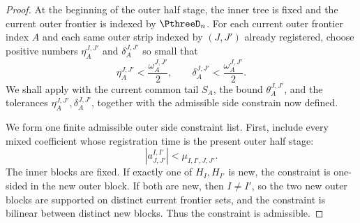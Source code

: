 \documentclass[11pt,reqno]{amsart}
\makeatletter
\theoremstyle{plain}
\theoremstyle{definition}
\newcounter{problempaper}
\newenvironment{problempaperbody}{%
  \setcounter{subsection}{0}%
  \setcounter{subsubsection}{0}%
  \setcounter{paragraph}{0}%
  \renewcommand{\thesubsection}{\arabic{subsection}}%
  \renewcommand{\thesubsubsection}{\thesubsection.\arabic{subsubsection}}%
  \renewcommand{\theparagraph}{\thesubsubsection.\arabic{paragraph}}%
  \let\problem@outersection\section
  \let\problem@outersubsection\subsection
  \let\problem@outersubsubsection\subsubsection
  \let\problem@outerparagraph\paragraph
  \let\section\problem@papersection
  \let\subsection\problem@papersubsection
  \let\subsubsection\problem@papersubsubsection
}{%
  \let\section\problem@outersection
  \let\subsection\problem@outersubsection
  \let\subsubsection\problem@outersubsubsection
  \let\paragraph\problem@outerparagraph
}
\newcommand{\problem@target}[2]{%
  \hypertarget{problem-\theproblempaper-#1-#2}{}%
}
\newcommand{\problem@paperheading}[3]{%
  \par\bigskip
  \problem@target{#1}{#2}%
  \noindent{\large\bfseries #2.\quad #3\par}%
  \nobreak\smallskip
}
\newcommand{\problem@papersubheading}[3]{%
  \par\medskip
  \problem@target{#1}{#2}%
  \noindent{\normalsize\bfseries #2.\quad #3\par}%
  \nobreak\smallskip
}
\newcommand{\problem@papersubsubheading}[3]{%
  \par\smallskip
  \problem@target{#1}{#2}%
  \noindent{\normalsize\itshape #2.\quad #3.\ }%
}
\def\problem@papersection{%
  \@ifstar{\problem@papersectionstar}{\problem@papersectionnostar}%
}
\def\problem@papersectionstar#1{%
  \par\bigskip\noindent{\large\bfseries #1\par}\nobreak\smallskip
}
\def\problem@papersectionnostar#1{%
  \refstepcounter{subsection}%
  \setcounter{subsubsection}{0}%
  \setcounter{paragraph}{0}%
  \problem@paperheading{section}{\thesubsection}{#1}%
  \problem@writecontentsline{section}{\thesubsection}{#1}%
}
\def\problem@papersubsection{%
  \@ifstar{\problem@papersubsectionstar}{\problem@papersubsectionnostar}%
}
\def\problem@papersubsectionstar#1{%
  \par\medskip\noindent{\normalsize\bfseries #1\par}\nobreak\smallskip
}
\def\problem@papersubsectionnostar#1{%
  \refstepcounter{subsubsection}%
  \setcounter{paragraph}{0}%
  \problem@papersubheading{subsection}{\thesubsubsection}{#1}%
  \problem@writecontentsline{subsection}{\thesubsubsection}{#1}%
}
\def\problem@papersubsubsection{%
  \@ifstar{\problem@papersubsubsectionstar}{\problem@papersubsubsectionnostar}%
}
\def\problem@papersubsubsectionstar#1{%
  \par\smallskip\noindent{\normalsize\itshape #1.\ }%
}
\def\problem@papersubsubsectionnostar#1{%
  \refstepcounter{paragraph}%
  \problem@papersubsubheading{subsubsection}{\theparagraph}{#1}%
  \problem@writecontentsline{subsubsection}{\theparagraph}{#1}%
}
\newcommand{\problem@writecontentsline}[3]{%
  \begingroup
  \protected@write\@auxout{}{%
    \string\problemcontentsentry{\theproblempaper}{#1}{#2}{#3}{\thepage}%
  }%
  \endgroup
}
\newcommand{\problemcontentsentry}[5]{%
  \@ifundefined{problemcontents@#1}{%
    \expandafter\gdef\csname problemcontents@#1\endcsname{}%
  }{}%
  \expandafter\g@addto@macro\csname problemcontents@#1\endcsname{%
    \problemcontentsline{#1}{#2}{#3}{#4}{#5}%
  }%
}
\newcommand{\problemcontentslink}[4]{%
  \hyperlink{problem-#1-#2-#3}{#4}%
}
\newcommand{\problemcontentsline}[5]{%
  \ifstrequal{#2}{section}{%
    \par\noindent
    \problemcontentslink{#1}{#2}{#3}{\makebox[2.5em][l]{#3}#4}%
    \nobreak\dotfill
    \problemcontentslink{#1}{#2}{#3}{#5}\par
  }{%
    \ifstrequal{#2}{subsection}{%
      \par\noindent\hspace*{1.5em}%
      \problemcontentslink{#1}{#2}{#3}{\makebox[3.5em][l]{#3}#4}%
      \nobreak\dotfill
      \problemcontentslink{#1}{#2}{#3}{#5}\par
    }{%
      \par\noindent\hspace*{3em}%
      \problemcontentslink{#1}{#2}{#3}{\makebox[4.5em][l]{#3}#4}%
      \nobreak\dotfill
      \problemcontentslink{#1}{#2}{#3}{#5}\par
    }%
  }%
}
\makeatother
\begin{document}
\begin{problempaperbody}
\begin{proof}
At the beginning of the outer half stage, the inner tree is fixed and the current outer frontier is indexed by $\PthreeD_n$. For each current outer frontier index $A$ and each same outer strip indexed by $(J,J')$ already registered, choose positive numbers $\eta_A^{J,J'}$ and $\delta_A^{J,J'}$ so small that
\begin{equation*}
        \eta_A^{J,J'}<\frac{\omega_A^{J,J'}}{2},\qquad \delta_A^{J,J'}<\frac{\omega_A^{J,J'}}{2}.
\end{equation*}
We shall apply  with the current common tail $S_A$, the bound $\theta_A^{J,J'}$, and the tolerances $\eta_A^{J,J'},\delta_A^{J,J'}$, together with the admissible side constrain now defined.

We form one finite admissible outer side constraint list. First, include every mixed coefficient whose registration time is the present outer half stage:
\begin{equation*}
        |a_{J,J'}^{I,I'}|<\mu_{I,I',J,J'}.
\end{equation*}
The inner blocks are fixed. If exactly one of $H_I,H_{I'}$ is new, the constraint is one-sided in the new outer block. If both are new, then $I\ne I'$, so the two new outer blocks are supported on distinct current frontier sets, and the constraint is bilinear between distinct new blocks. Thus the constraint is admissible.


\end{proof}
\end{problempaperbody}
\end{document}
